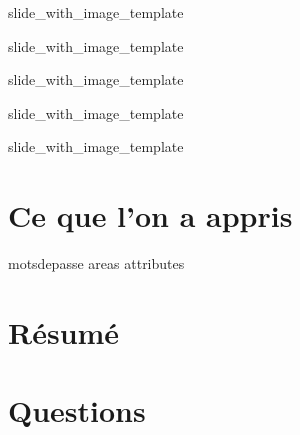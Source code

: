 \documentclass{beamer}
\begin{document}
\def\titlename{Team}
\def\imagepath{images/database/Team.png}
 {slide_with_image_template}

\def\titlename{Task}
\def\imagepath{images/database/Task.png}
 {slide_with_image_template}

\def\titlename{Event}
\def\imagepath{images/database/Event.png}
 {slide_with_image_template}

\def\titlename{Document}
\def\imagepath{images/database/Document.png}
 {slide_with_image_template}

\def\titlename{Message}
\def\imagepath{images/database/Message.png}
 {slide_with_image_template}

\section{Ce que l'on a appris}
 {motsdepasse}
 {areas}
 {attributes}

\section{Résumé}


\section{Questions}

\end{document}
